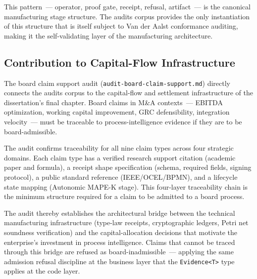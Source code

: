 This pattern~--- operator, proof gate, receipt, refusal, artifact~--- is the
canonical manufacturing stage structure. The audits corpus provides the only
instantiation of this structure that is itself subject to Van der Aalst
conformance auditing, making it the self-validating layer of the manufacturing
architecture.

\subsection{Contribution to Capital-Flow Infrastructure}
\label{sec:audits-contribution-capital}

The board claim support audit (\texttt{audit-board-claim-support.md}) directly
connects the audits corpus to the capital-flow and settlement infrastructure of
the dissertation's final chapter. Board claims in M\&A contexts~--- EBITDA
optimization, working capital improvement, GRC defensibility, integration
velocity~--- must be traceable to process-intelligence evidence if they are to be
board-admissible.

The audit confirms traceability for all nine claim types across four strategic
domains. Each claim type has a verified research support citation (academic paper
and formula), a receipt shape specification (schema, required fields, signing
protocol), a public standard reference (IEEE/OCEL/BPMN), and a lifecycle state
mapping (Autonomic MAPE-K stage). This four-layer traceability chain is the
minimum structure required for a claim to be admitted to a board process.

The audit thereby establishes the architectural bridge between the technical
manufacturing infrastructure (type-law receipts, cryptographic ledgers, Petri net
soundness verification) and the capital-allocation decisions that motivate the
enterprise's investment in process intelligence. Claims that cannot be traced
through this bridge are refused as board-inadmissible~--- applying the same
admission refusal discipline at the business layer that the \texttt{Evidence<T>}
type applies at the code layer.
